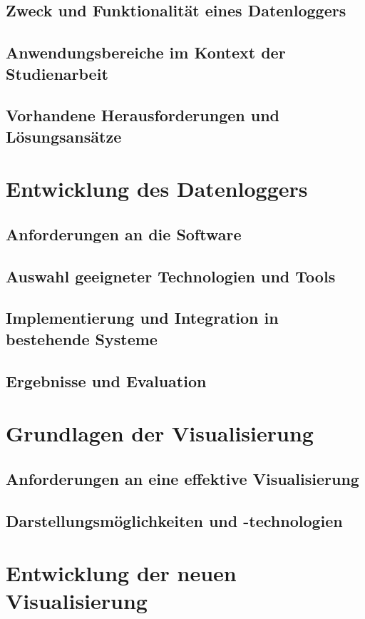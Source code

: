 \documentclass[a4paper, 12pt]{article} %
\begin{document}
\subsection{Zweck und Funktionalität eines Datenloggers}
\subsection{Anwendungsbereiche im Kontext der Studienarbeit}
\subsection{Vorhandene Herausforderungen und Lösungsansätze}

\section{Entwicklung des Datenloggers}
\subsection{Anforderungen an die Software}
\subsection{Auswahl geeigneter Technologien und Tools}
\subsection{Implementierung und Integration in bestehende Systeme}
\subsection{Ergebnisse und Evaluation}

\section{Grundlagen der Visualisierung}
\subsection{Anforderungen an eine effektive Visualisierung}
\subsection{Darstellungsmöglichkeiten und -technologien}

\section{Entwicklung der neuen Visualisierung}
\end{document}
